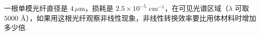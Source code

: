\documentclass{assignment}
\begin{document}
\begin{prob}
    一根单模光纤直径是 $4\,\mu$m，损耗是 $2.5\times 10^{-5}$ cm$^{-1}$，在可见光谱区域（$\lambda$ 可取 $5000$ \AA），如果用这根光纤观察非线性现象，非线性转换效率要比用体材料时增加多少倍.
\end{prob}
\begin{sol}
    
\end{sol}
\end{document}
